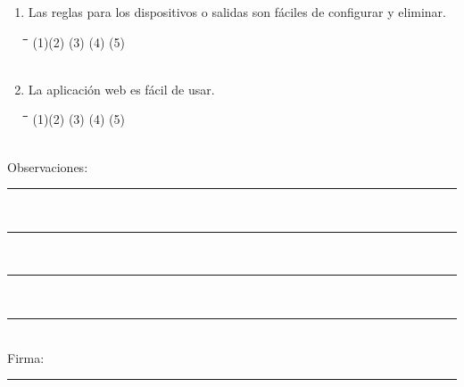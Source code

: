 \documentclass[]{proc}
\begin{document}
\begin{enumerate}
	\item Las reglas para los dispositivos o salidas son fáciles de configurar y eliminar.
	
	\begin{tabbing}
		\hspace{1cm}\=\hspace{1cm}\=\hspace{1cm}\=\hspace{1cm}\=\kill
		(1)\>(2)  \>(3)  \>(4)  \>(5) \\\\
	\end{tabbing} 
	
	\item La aplicación web es fácil de usar.
	
	\begin{tabbing}
		\hspace{1cm}\=\hspace{1cm}\=\hspace{1cm}\=\hspace{1cm}\=\kill
		(1)\>(2)  \>(3)  \>(4)  \>(5) \\\\
	\end{tabbing} 
	
\end{enumerate}

Observaciones: \rule{5cm}{0.1mm}\\
\rule{7.8cm}{0.1mm}\\
\rule{7.8cm}{0.1mm}\\
\rule{7.8cm}{0.1mm}\\
[9.2cm]

Firma: \rule{5cm}{0.1mm}
\end{document}
